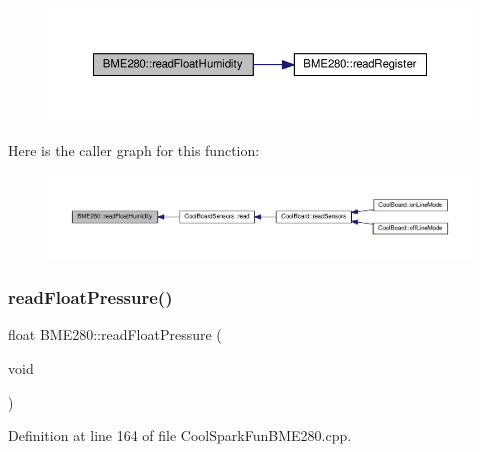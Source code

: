 \begin{figure}[H]
\begin{center}
\leavevmode
\includegraphics[width=350pt]{df/dcf/class_b_m_e280_a42ea7232039eebf5aadb391ef6132c35_cgraph}
\end{center}
\end{figure}
Here is the caller graph for this function\+:\nopagebreak
\begin{figure}[H]
\begin{center}
\leavevmode
\includegraphics[width=350pt]{df/dcf/class_b_m_e280_a42ea7232039eebf5aadb391ef6132c35_icgraph}
\end{center}
\end{figure}
\mbox{\label{class_b_m_e280_ada6e799917afb4f228e6253bc56ffe75}} 
\subsubsection{\texorpdfstring{read\+Float\+Pressure()}{readFloatPressure()}}
{\footnotesize\ttfamily float B\+M\+E280\+::read\+Float\+Pressure (\begin{DoxyParamCaption}\item[{void}]{ }\end{DoxyParamCaption})}



Definition at line 164 of file Cool\+Spark\+Fun\+B\+M\+E280.\+cpp.


